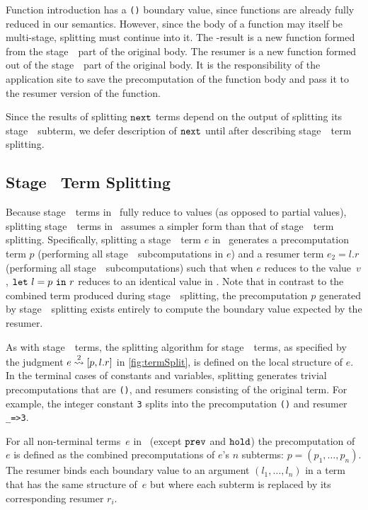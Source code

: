 Function introduction has a \texttt{()} boundary value,
since functions are already fully reduced in our semantics.
However, since the body of a function may itself be multi-stage, splitting must continue into it.
The \bbone-result is a new function formed from the stage~\bbone\ part of the original body.
The resumer is a new function formed out of the stage~\bbtwo\ part of the original body.
It is the responsibility of the application site to save the precomputation of the function body
and pass it to the resumer version of the function.

Since the results of splitting ${\tt next}$ terms depend on the output of splitting its stage~\bbtwo\ subterm,
we defer description of ${\tt next}$ until after describing stage~\bbtwo\ term splitting.

\subsection{Stage \bbtwo\ Term Splitting}

Because stage~\bbtwo\ terms in \lang\ fully reduce to values (as opposed to partial values),
splitting stage~\bbtwo\ terms in \lang\ assumes a simpler form than that of stage~\bbone\ term splitting. 
Specifically, splitting a stage~\bbtwo\ term $e$ in \lang\ generates a precomputation term $p$
(performing all stage~\bbone\ subcomputations in $e$) and a
resumer term $e_2=l.r$ (performing all stage~\bbtwo\ subcomputations) such that when 
$e$ reduces to the value~$v$, ${\tt let}~{l} = {p}~{\tt in}~{r}$ reduces to an identical value in \langmono.
Note that in contrast to the combined term produced during stage~\bbone\ splitting,
the precomputation $p$ generated by stage~\bbtwo\ splitting exists entirely
to compute the boundary value expected by the resumer.


As with stage~\bbone\ terms, the splitting algorithm for stage~\bbtwo\ terms,
as specified by the judgment $e \overset{ 2}\rightsquigarrow [p,l.r]$ in \cref{fig:termSplit}, is defined on the local structure of $e$.
In the terminal cases of
constants and variables, splitting generates trivial precomputations that are \texttt{()}, and resumers consisting of the original term.
For example, the integer constant \texttt{3} splits into the
precomputation \texttt{()} and resumer \texttt{\_=>3}.

For all non-terminal terms~$e$ in \lang\ (except ${\tt prev}$
and ${\tt hold}$)
the precomputation of~$e$ is defined as the combined precomputations of $e$'s $n$ subterms:
$p=(p_1,\ldots,p_n)$.  The resumer binds each boundary value to an
argument $(l_1,\ldots,l_n)$ in a term that has the same structure
of~$e$ but where each subterm is replaced by its corresponding resumer $r_i$.

